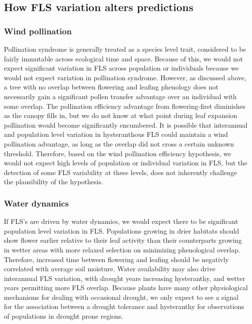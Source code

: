 \documentclass[12pt]{article}\usepackage[]{graphicx}\usepackage[]{color}
\begin{document}
\subsection*{How FLS variation alters predictions}
\subsubsection*{Wind pollination} 
\indent\indent  Pollination syndrome is generally treated as a species level trait, considered to be fairly immutable across ecological time and space. Because of this, we would not expect significant variation in FLS across population or individuals because we would not expect variation in pollination syndrome. However, as discussed above, a tree with no overlap between flowering and leafing phenology does not necessarily gain a significant pollen transfer advantage over an individual with some overlap. The pollination efficiency advantage from flowering-first diminishes as the canopy fills in, but  we do not know at what point during leaf expansion pollination would become significantly encumbered. It is possible that interannual and population level variation in hysteranthous FLS could maintain a wind pollination advantage, as long as the overlap did not cross a certain unknown threshold. Therefore, based on the wind pollination efficiency hypothesis, we would not expect high levels of population or individual variation in FLS, but the detection of some FLS variability at these levels, does not inherently challenge the plausibility of the hypothesis.
\subsubsection*{Water dynamics} 
\indent\indent If FLS's are driven by water dynamics, we would expect there to be significant population level variation in FLS. Populations growing in drier habitats should show flower earlier relative to their leaf activity than their counterparts growing in wetter areas with more relaxed selection on minimizing phenological overlap. Therefore, increased time between flowering and leafing should be negativly correlated with average soil moisture. Water availability may also drive interannual FLS variation, with drought years increasing hysteranthy, and wetter years permitting more FLS overlap. Because plants have many other physiological mechanisms for dealing with occasional drought, we only expect to see a signal for the association between a drought tolerance and hysteranthy for observations of populations in drought prone regions. 
\end{document}
